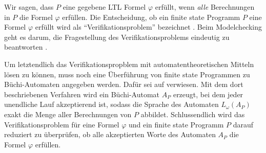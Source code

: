 Wir sagen, dass $P$ eine gegebene LTL Formel $\varphi$ erfüllt, wenn \textit{alle} Berechnungen in $P$ die Formel $\varphi$ erfüllen. Die Entscheidung, ob ein finite state Programm $P$ eine Formel $\varphi$ erfüllt wird als "`Verifikationsproblem"' bezeichnet \cite{vardi+96}. Beim Modelchecking geht es darum, die Fragestellung des Verifikationsproblems eindeutig zu beantworten \cite{huth+04,vardi+96}.

Um letztendlich das Verifikationspropblem mit automatentheoretischen Mitteln lösen zu können, muss noch eine Überführung von finite state Programmen zu Büchi-Automaten angegeben werden. Dafür sei auf \cite[Kap. 4.2]{vardi+96} verwiesen. Mit dem dort beschriebenen Verfahren wird ein Büchi-Automat $A_P$ erzeugt, bei dem jeder unendliche Lauf akzeptierend ist, sodass die Sprache des Automaten $L_\omega(A_P)$ exakt die Menge aller Berechnungen von $P$ abbildet. Schlussendlich wird das Verifikationsproblem für eine Formel $\varphi$ und ein finite state Programm $P$ darauf reduziert zu überprüfen, ob alle akzeptierten Worte des Automaten $A_P$ die Formel $\varphi$ erfüllen.